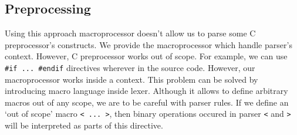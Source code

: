 \subsection{Preprocessing}
Using this approach macroprocessor doesn't allow us to parse some C
preprocessor's constructs. We provide the macroprocessor which handle parser's
context.  However, C preprocessor works out of scope. For example, we can use
\verb|#if ... #endif| directives wherever in the source code. However, our
macroprocessor works inside a context. This problem can be solved by
introducing macro language inside lexer. Although it allows to define arbitrary
macros out of any scope, we are to be careful with parser rules. If we define
an `out of scope' macro \verb|< ... >|, then binary operations occured in
parser \verb|<| and \verb|>| will be interpreted as parts of this directive.  
